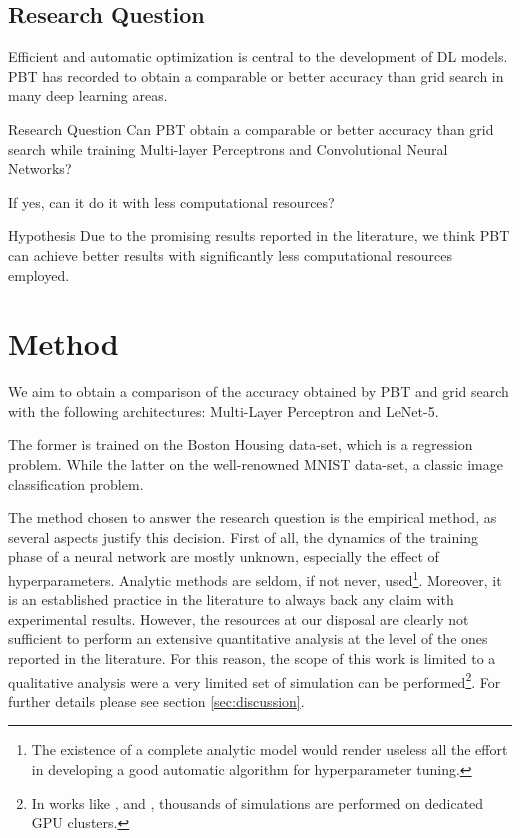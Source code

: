 \documentclass{article}
\begin{document}
\subsection{Research Question}
\label{sect:questions}
Efficient and automatic optimization is central to the development of DL models.
PBT has recorded to obtain a comparable or better accuracy than grid search in many deep learning areas\cite{PBT}.

\begin{mybox}[colback = white, width = \textwidth]{Research Question}
Can PBT obtain a comparable or better accuracy than grid search while training Multi-layer Perceptrons and Convolutional Neural Networks? 
    
If yes, can it do it with less computational resources?
\end{mybox}
\begin{mybox}[colback = white, width = \textwidth]{Hypothesis}
Due to the promising results reported in the literature, we think PBT can achieve better results with significantly less computational resources employed.
\end{mybox}


\section{Method}
\label{sec:method}
We aim to obtain a comparison of the accuracy obtained by PBT and grid search with the following architectures: Multi-Layer Perceptron and LeNet-5\cite{LeNet5}.

The former is trained on the Boston Housing data-set\cite{harrub78}, which is a regression problem. While the latter on the well-renowned MNIST data-set\cite{lecun-mnisthandwrittendigit-2010}, a classic image classification problem.

The method chosen to answer the research question is the empirical method, as several aspects justify this decision. First of all, the dynamics of the training phase of a neural network are mostly unknown, especially the effect of hyperparameters. Analytic methods are seldom, if not never, used\footnote{The existence of a complete analytic model would render useless all the effort in developing a good automatic algorithm for hyperparameter tuning.}. Moreover, it is an established practice in the literature to always back any claim with experimental results\cite{pmlr-v70-real17a}\cite{Bergstra:2012:RSH:2188385.2188395}\cite{Larochelle:2007:EED:1273496.1273556}\cite{Bergstra:2011:AHO:2986459.2986743}. However, the resources at our disposal are clearly not sufficient to perform an extensive quantitative analysis at the level of the ones reported in the literature. For this reason, the scope of this work is limited to a qualitative analysis were a very limited set of simulation can be performed\footnote{In works like \cite{pmlr-v70-real17a}, \cite{Bergstra:2012:RSH:2188385.2188395} and \cite{Bergstra:2011:AHO:2986459.2986743}, thousands of simulations are performed on dedicated GPU clusters.}. For further details please see section \ref{sec:discussion}. 
\end{document}
